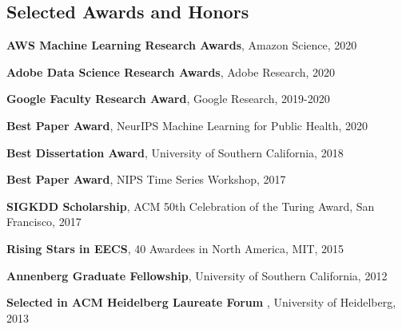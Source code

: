 \documentclass[margin,line]{res}
\newenvironment{list1}{
  \begin{list}{\ding{113}}{%
      \setlength{\itemsep}{0in}
      \setlength{\parsep}{0in} \setlength{\parskip}{0in}
      \setlength{\topsep}{0in} \setlength{\partopsep}{0in} 
      \setlength{\leftmargin}{0.17in}}}{\end{list}}
\begin{document}
\begin{resume}


\section{\sc Selected Awards and Honors} 

\textbf{AWS Machine Learning Research Awards},  Amazon Science, 2020

\textbf{Adobe Data Science Research Awards},  Adobe Research, 2020

\textbf{Google Faculty Research  Award},  Google Research, 2019-2020

\textbf{Best Paper Award},  NeurIPS Machine Learning for Public Health, 2020


\textbf{Best Dissertation Award}, University of Southern California, 2018

\textbf{Best Paper Award},  NIPS Time Series Workshop, 2017

\textbf{SIGKDD Scholarship},  ACM 50th Celebration of the Turing Award, San Francisco, 2017

\textbf{Rising Stars in EECS},  40 Awardees in North America, MIT, 2015

\textbf{Annenberg Graduate Fellowship}, University of Southern California, 2012







%

\textbf{Selected in ACM Heidelberg Laureate Forum }, University of Heidelberg, 2013



\end{resume}
\end{document}
